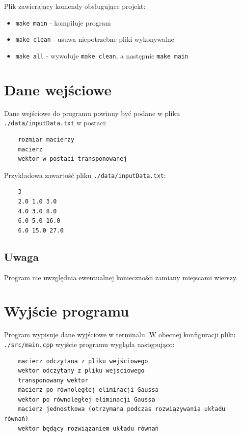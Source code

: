 \documentclass{article}
\begin{document}
Plik zawierający komendy obsługujące projekt:
\begin{itemize}
    \item \texttt{make main} - kompiluje program
    \item \texttt{make clean} - usuwa niepotrzebne pliki wykonywalne
    \item \texttt{make all} - wywołuje \texttt{make clean}, a następnie \texttt{make main}
\end{itemize}



\section{Dane wejściowe}

Dane wejściowe do programu powinny być podane w pliku \texttt{./data/inputData.txt} w postaci:

\begin{verbatim}
    rozmiar macierzy
    macierz
    wektor w postaci transponowanej
\end{verbatim}

Przykładowa zawartość pliku \texttt{./data/inputData.txt}:

\begin{verbatim}
    3
    2.0 1.0 3.0
    4.0 3.0 8.0
    6.0 5.0 16.0
    6.0 15.0 27.0
\end{verbatim}

\subsection{Uwaga}
Program nie uwzględnia ewentualnej konieczności zamiany miejscami wierszy.



\section{Wyjście programu}

Program wypisuje dane wyjściowe w terminalu. W obecnej konfiguracji pliku \texttt{./src/main.cpp} wyjście programu wygląda następująco:

\begin{verbatim}
    macierz odczytana z pliku wejściowego
    wektor odczytany z pliku wejsciowego
    transponowany wektor
    macierz po równoległej eliminacji Gaussa
    wektor po równoległej eliminacji Gaussa
    macierz jednostkowa (otrzymana podczas rozwiązywania układu równań)
    wektor będący rozwiązaniem układu równań
\end{verbatim}
\end{document}
